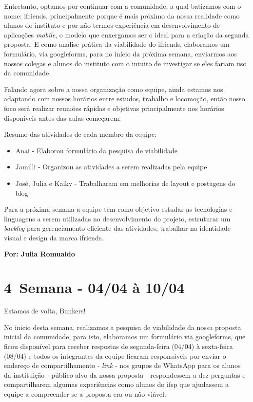 Entretanto, optamos por continuar com a comunidade, a qual batizamos com o nome: \gls{ifriends}, principalmente porque é mais próximo da nossa realidade como alunos do instituto e por não termos experiência em desenvolvimento de aplicações \textsl{mobile}, o modelo que enxergamos ser o ideal para a criação da segunda proposta. E como análise prática da viabilidade do \gls{ifriends}, elaboramos um formulário, via \gls{googleforms}, para no início da próxima semana, enviarmos aos nossos colegas e alunos do instituto com o intuito de investigar se eles fariam uso da comunidade.

Falando agora sobre a nossa organização como equipe, ainda estamos nos adaptando com nossos horários entre estudos, trabalho e locomoção, então nosso foco será realizar reuniões rápidas e objetivas principalmente nos horários disponíveis antes das aulas começarem.

Resumo das atividades de cada membro da equipe:

\begin{itemize}
    \item Anai - Elaborou formulário da pesquisa de viabilidade
    \item Jamilli - Organizou as atividades a serem realizadas pela equipe 
    \item José, Julia e Kaiky - Trabalharam em melhorias de layout e postagens do blog
\end{itemize}

Para a próxima semana a equipe tem como objetivo estudar as tecnologias e linguagens a serem utilizadas no desenvolvimento do projeto, estruturar um \textsl{backlog} para gerenciamento eficiente das atividades, trabalhar na identidade visual e design da marca \gls{ifriends}.    

\textbf{Por: Julia Romualdo}

\section{4\textordfeminine \, Semana - 04/04 à 10/04}
Estamos de volta, Bunkers!

No inicio desta semana, realizamos a pesquisa de viabilidade da nossa proposta inicial da comunidade, para isto, elaboramos um formulário via \gls{googleforms}, que ficou disponível para receber respostas de segunda-feira (04/04) à sexta-feira (08/04) e todos os integrantes da equipe ficaram responsáveis por enviar o endereço de compartilhamento - \textsl{link} - nos grupos de \gls{WhatsApp} para os alunos da instituição - público-alvo da nossa proposta - respondessem a dez perguntas e compartilharem algumas experiências como alunos do \acs{ifsp} que ajudassem a equipe a compreender se a proposta era ou não viável.

